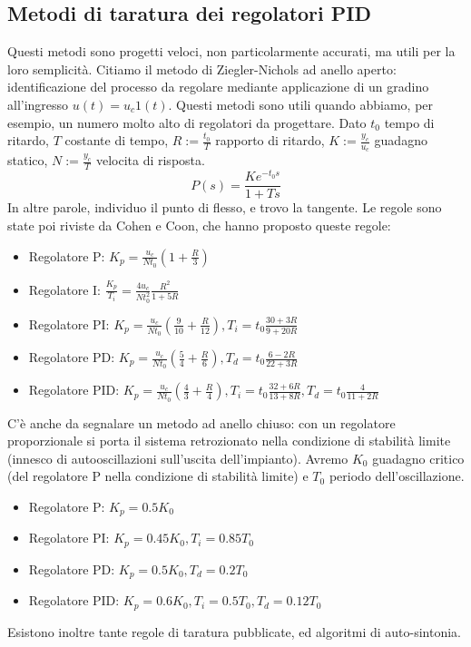 \documentclass[11pt]{article}
\begin{document}
\subsection{Metodi di taratura dei regolatori PID}
Questi metodi sono progetti veloci, non particolarmente accurati, ma utili per la loro semplicità. Citiamo il metodo di Ziegler-Nichols ad anello aperto: identificazione del processo da regolare mediante applicazione di un gradino all'ingresso $u(t) = u_c1(t)$. Questi metodi sono utili quando abbiamo, per esempio, un numero molto alto di regolatori da progettare. Dato $t_0$ tempo di ritardo, $T$ costante di tempo, $R:=\frac{t_0}{T}$ rapporto di ritardo, $K:=\frac{y_c}{u_c}$ guadagno statico, $N:=\frac{y_c}{T}$ velocita di risposta.
\begin{displaymath}
    P(s)=\frac{Ke^{-t_0s}}{1+Ts}
\end{displaymath}
In altre parole, individuo il punto di flesso, e trovo la tangente. Le regole sono state poi riviste da Cohen e Coon, che hanno proposto queste regole:\begin{itemize}
    \item Regolatore P: $K_p = \frac{u_c}{Nt_0}\left(1+\frac{R}{3}\right)$
    \item Regolatore I: $\frac{K_p}{T_i}=\frac{4u_c}{Nt_0^2}\frac{R^2}{1+5R}$
    \item Regolatore PI: $K_p = \frac{u_c}{Nt_0}\left(\frac{9}{10}+\frac{R}{12}\right), T_i = t_0\frac{30+3R}{9+20R}$
    \item Regolatore PD: $K_p=\frac{u_c}{Nt_0}\left(\frac{5}{4}+\frac{R}{6}\right), T_d=t_0\frac{6-2R}{22+3R}$
    \item Regolatore PID: $K_p = \frac{u_c}{Nt_0} \left(\frac{4}{3}+\frac{R}{4}\right), T_i = t_0\frac{32+6R}{13+8R}, T_d=t_0\frac{4}{11+2R}$
\end{itemize}
C'è anche da segnalare un metodo ad anello chiuso: con un regolatore proporzionale si porta il sistema retrozionato nella condizione di stabilità limite (innesco di autooscillazioni sull'uscita dell'impianto). Avremo $K_0$ guadagno critico (del regolatore P nella condizione di stabilità limite) e $T_0$ periodo dell'oscillazione.
\begin{itemize}
    \item Regolatore P: $K_p = 0.5K_0$
    \item Regolatore PI: $K_p = 0.45K_0, T_i=0.85T_0$
    \item Regolatore PD: $K_p = 0.5K_0, T_d = 0.2T_0$
    \item Regolatore PID: $K_p = 0.6K_0, T_i = 0.5T_0, T_d = 0.12T_0$
\end{itemize}
Esistono inoltre tante regole di taratura pubblicate, ed algoritmi di auto-sintonia.
\end{document}
